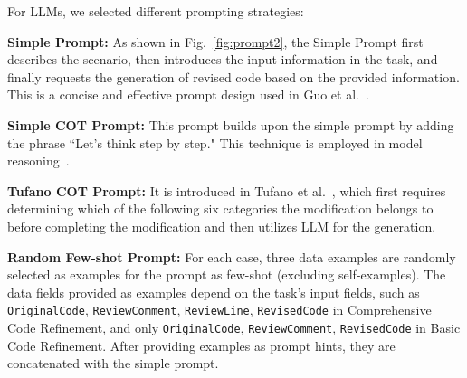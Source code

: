 For LLMs, we selected different prompting strategies:

\noindent \textbf{Simple Prompt:} As shown in Fig.~\ref{fig:prompt2}, the Simple Prompt first describes the scenario, then introduces the input information in the task, and finally requests the generation of revised code based on the provided information. This is a concise and effective prompt design used in Guo et al.~\cite{guo2024exploring}.

\noindent \textbf{Simple COT Prompt:} This prompt builds upon the simple prompt by adding the phrase ``Let's think step by step." This technique is employed in model reasoning~\cite{wei2022chain,wang2022self}.

\noindent \textbf{Tufano COT Prompt:} It is introduced in Tufano et al.~\cite{tufano2024code}, which first requires determining which of the following six categories the modification belongs to before completing the modification and then utilizes LLM for the generation.








\noindent \textbf{Random Few-shot Prompt:} For each case, three data examples are randomly selected as examples for the prompt as few-shot (excluding self-examples). The data fields provided as examples depend on the task's input fields, such as \texttt{OriginalCode}, \texttt{ReviewComment}, \texttt{ReviewLine}, \texttt{RevisedCode} in Comprehensive Code Refinement, and only \texttt{OriginalCode}, \texttt{ReviewComment}, \texttt{RevisedCode} in Basic Code Refinement. After providing examples as prompt hints, they are concatenated with the simple prompt.

